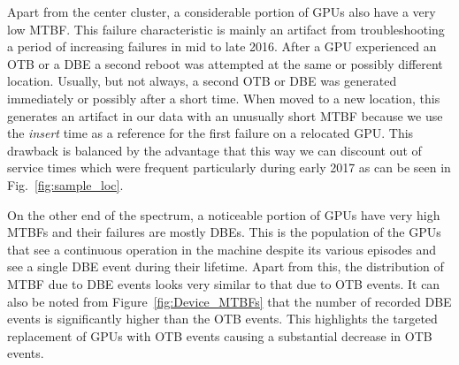 Apart from the center cluster, a considerable portion of GPUs also have a very 
low MTBF. This failure characteristic is mainly an artifact from
troubleshooting a period of increasing failures in mid to late 2016.
After a GPU experienced an OTB or a DBE a second reboot was attempted at
the same or possibly different location. Usually, but not always, a
second OTB or DBE was generated immediately or possibly after a short
time. When moved to a new location, this generates an artifact in our
data with an unusually short MTBF because we use the {\em insert} time as
a reference for the first failure on a relocated GPU. This drawback is
balanced by the advantage that this way we can discount out of service times
which were frequent particularly during early 2017 as can be seen in
Fig.~\ref{fig:sample_loc}.

On the other end of the spectrum, a noticeable portion of GPUs have very high
MTBFs and their failures are mostly DBEs. This is the population of the GPUs that see a continuous operation in the machine 
despite its various episodes and see a single DBE event during their lifetime.
Apart from this, the distribution of MTBF due to DBE events looks very similar to that due 
to OTB events. It can also be noted from Figure~\ref{fig:Device_MTBFs} that the number of recorded 
DBE events is significantly higher than the OTB events. This highlights the targeted replacement of GPUs 
with OTB events causing a substantial decrease in OTB events.  



